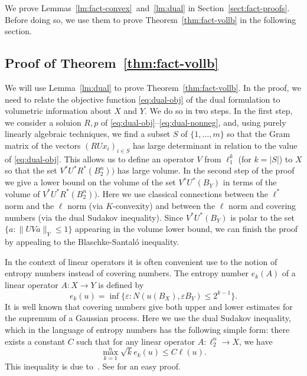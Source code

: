 \documentclass[11pt]{article}
\begin{document}
We prove Lemmas~\ref{lm:fact-convex}~and~\ref{lm:dual} in
Section~\ref{sect:fact-proofs}. Before doing so, we use them to prove
Theorem~\ref{thm:fact-vollb} in the following section. 

\subsection{Proof of Theorem~\ref{thm:fact-vollb}}
\label{sect:fact-pf}

We will use Lemma~\ref{lm:dual} to prove Theorem~\ref{thm:fact-vollb}.
In the proof, we need to relate the objective function
\eqref{eq:dual-obj} of the dual formulation to volumetric information
about $X$ and $Y$. We do so in two steps. In the first step, we
consider a soluion $R, p$ of
\eqref{eq:dual-obj}--\eqref{eq:dual-nonneg}, and, using purely
linearly algebraic techniques, we find a subset $S$ of $\{1, \ldots,
m\}$ so that the Gram matrix of the vectors $(RUx_i)_{i \in S}$ has large
determinant  in relation to the value of
\eqref{eq:dual-obj}. This allows us to define an operator $V$ from
$\ell_1^k$ (for  $k = |S|$) to $X$ so that the set
$V^*U^*R^*(B_2^n))$ has large volume. In the second step of the proof
we give a lower bound on the volume of the set $V^*U^*(B_Y)$ in terms
of the volume of $V^*U^*R^*(B_2^n))$. Here we use classical
connections between the $\ell^*$ norm and the $\ell$ norm (via
$K$-convexity) and between the $\ell$ norm and covering numbers (via
the dual Sudakov inequality). Since $V^*U^*(B_Y)$ is polar to the set
$\{a: \|UVa\|_Y \le 1\}$ appearing in the volume lower bound, we can
finish the proof by appealing to the Blaschke-Santal\'o inequality.


In the context of linear operators it is often convenient use to the
notion of entropy numbers instead of covering numbers.  The entropy
number $e_k(A)$ of a linear operator $A:X \to Y$ is defined by
\[
e_k(u) = \inf\{\varepsilon: N(u(B_X), \varepsilon B_Y) \le 2^{k-1}\}. 
\]
It is well known that covering numbers give both upper and lower
estimates for the supremum of a Gaussian process. Here we use the dual
Sudakov inequality, which in the language of entropy numbers has the
following simple form: there exists a constant $C$ such that for any
linear operator $A:\ell_2^n \to X$, we have
\begin{equation}
  \label{eq:sudakov}
  \max_{k = 1}^n \sqrt{k}e_k(u) \le C\ell(u). 
\end{equation}
This inequality is due to~\cite{PTJ85}. See \cite[Section
3.3]{LT91-book} for an easy proof. 
\end{document}
